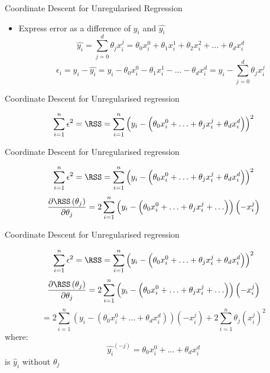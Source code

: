 \documentclass{beamer}
\begin{document}
\begin{frame}{Coordinate Descent for Unregularised Regression}

\begin{itemize}[<+->]
	
	
	
	
	
	\item Express error as a difference of $y_{i}$ and $\hat{y_{i}}$
	\begin{equation}
	\hat{y_i} = \sum_{j=0}^{d} \theta_{j}x^{j}_{i} = \theta_{0}x_{i}^{0} + \theta_{1}x_{i}^{1} +\theta_{2}x_{i}^{2} + \ldots + \theta_{d}x_{i}^{d}
	\end{equation}
	\begin{equation}
	\epsilon_{i} = y_{i} - \hat{y_{i}} = y_{i} - \theta_{0}x_{i}^{0} - \theta_{1}x_{i}^{1} - \ldots - \theta_{d}x_{i}^{d} = y_{i} - \sum_{j=0}^{d} \theta_{j}x_{i}^{j}
	\end{equation}
	
	
	
\end{itemize}


\end{frame}



\begin{frame}{Coordinate Descent for Unregularised regression}

\[
\sum_{i=1}^{n}  \epsilon^{2}=\RSS =\sum_{i=1}^{n}\left(y_{i}-\left(\theta_{0}x_{i}^{0}+\ldots + \theta_{j} x_{i}^{j}+\theta_{d} x_{i}^{d}\right)\right)^{2}
\]
\end{frame}

\begin{frame}{Coordinate Descent for Unregularised regression}

\[
\sum_{i=1}^{n}  \epsilon^{2}=\RSS =\sum_{i=1}^{n}\left(y_{i}-\left(\theta_{0}x_{i}^{0}+\ldots + \theta_{j} x_{i}^{j}+\theta_{d} x_{i}^{d}\right)\right)^{2}
\]
\[
\frac{\partial \RSS\left(\theta_{j}\right)}{\partial \theta_{j}}= 2 \sum_{i=1}^{n}\left(y_{i}-\left(\theta_{0}x_{i}^{0}+\ldots + \theta_{j} x_{i}^{j}+\ldots \right)\right)\left(-x_{i}^{j}\right)
\]
\end{frame}

\begin{frame}{Coordinate Descent for Unregularised regression}

\[
\sum_{i=1}^{n}  \epsilon^{2}=\RSS =\sum_{i=1}^{n}\left(y_{i}-\left(\theta_{0}x_{i}^{0}+\ldots + \theta_{j} x_{i}^{j}+\theta_{d} x_{i}^{d}\right)\right)^{2}
\]
\[
\frac{\partial \RSS\left(\theta_{j}\right)}{\partial \theta_{j}}= 2 \sum_{i=1}^{n}\left(y_{i}-\left(\theta_{0}x_{i}^{0}+\ldots + \theta_{j} x_{i}^{j}+\ldots \right)\right)\left(-x_{i}^{j}\right)
\]
\[
=2\sum_{i=1}^{n}\left(y_{i}-\left(\theta_{0} x_{i}^{0}+\ldots + \theta_{d} x_{i}^{d}\right)\right)\left(-x_{i}^{j}\right)+2 \sum_{i=1}^{n} \theta_{j}(x_{i}^j)^2
\]
\pause where: $$\hat{y_{i}}^{(-j)} = \theta_{0} x_{i}^{0}+\ldots + \theta_{d} x_{i}^{d}$$ is $\hat{y}_{i}$ without $\theta_{j}$
\end{frame}
\end{document}
